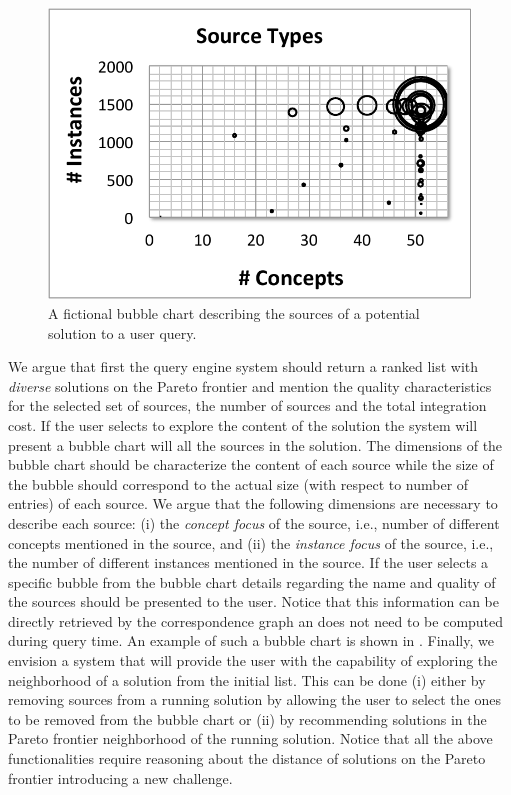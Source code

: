 \documentclass{sig-alternate}
\begin{document}
\begin{figure}
	\begin{center}
	\includegraphics[clip,scale=0.4]{fig/sources.pdf}
	\caption{A fictional bubble chart describing the sources of a potential solution to a user query.}
	\label{fig:bubble}
	\end{center}
	\vspace{-10pt}
\end{figure}

We argue that first the query engine system should return a ranked list with {\em diverse} solutions on the Pareto frontier and mention the quality characteristics for the selected set of sources, the number of sources and the total integration cost. If the user selects to explore the content of the solution the system will present a bubble chart will all the sources in the solution. The dimensions of the bubble chart should be characterize the content of each source while the size of the bubble should correspond to the actual size (with respect to number of entries) of each source. We argue that the following dimensions are necessary to describe each source: (i) the {\em concept focus} of the source, i.e., number of different concepts mentioned in the source, and (ii) the {\em instance focus} of the source, i.e., the number of different instances mentioned in the source. If the user selects a specific bubble from the bubble chart details regarding the name and quality of the sources should be presented to the user. Notice that this information can be directly retrieved by the correspondence graph an does not need to be computed during query time. An example of such a bubble chart is shown in . Finally, we envision a system that will provide the user with the capability of exploring the neighborhood of a solution from the initial list. This can be done (i) either by removing sources from a running solution by allowing the user to select the ones to be removed from the bubble chart or (ii) by recommending solutions in the Pareto frontier neighborhood of the running solution. Notice that all the above functionalities require reasoning about the distance of solutions on the Pareto frontier introducing a new challenge.
\end{document}
